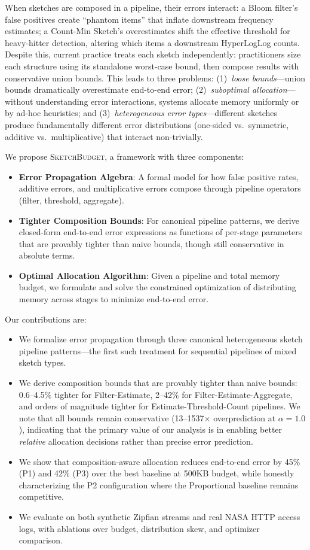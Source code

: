 \documentclass[preprint]{article}
\newcommand{\SketchBudget}{\textsc{SketchBudget}}
\begin{document}
When sketches are composed in a pipeline, their errors interact: a Bloom filter's false positives create ``phantom items'' that inflate downstream frequency estimates; a Count-Min Sketch's overestimates shift the effective threshold for heavy-hitter detection, altering which items a downstream HyperLogLog counts. Despite this, current practice treats each sketch independently: practitioners size each structure using its standalone worst-case bound, then compose results with conservative union bounds. This leads to three problems: (1)~\emph{loose bounds}---union bounds dramatically overestimate end-to-end error; (2)~\emph{suboptimal allocation}---without understanding error interactions, systems allocate memory uniformly or by ad-hoc heuristics; and (3)~\emph{heterogeneous error types}---different sketches produce fundamentally different error distributions (one-sided vs.\ symmetric, additive vs.\ multiplicative) that interact non-trivially.

We propose \SketchBudget{}, a framework with three components:
\begin{itemize}
    \item \textbf{Error Propagation Algebra}: A formal model for how false positive rates, additive errors, and multiplicative errors compose through pipeline operators (filter, threshold, aggregate).
    \item \textbf{Tighter Composition Bounds}: For canonical pipeline patterns, we derive closed-form end-to-end error expressions as functions of per-stage parameters that are provably tighter than naive bounds, though still conservative in absolute terms.
    \item \textbf{Optimal Allocation Algorithm}: Given a pipeline and total memory budget, we formulate and solve the constrained optimization of distributing memory across stages to minimize end-to-end error.
\end{itemize}

Our contributions are:
\begin{itemize}
    \item We formalize error propagation through three canonical heterogeneous sketch pipeline patterns---the first such treatment for sequential pipelines of mixed sketch types.
    \item We derive composition bounds that are provably tighter than naive bounds: 0.6--4.5\% tighter for Filter-Estimate, 2--42\% for Filter-Estimate-Aggregate, and orders of magnitude tighter for Estimate-Threshold-Count pipelines. We note that all bounds remain conservative (13--1537$\times$ overprediction at $\alpha=1.0$), indicating that the primary value of our analysis is in enabling better \emph{relative} allocation decisions rather than precise error prediction.
    \item We show that composition-aware allocation reduces end-to-end error by 45\% (P1) and 42\% (P3) over the best baseline at 500KB budget, while honestly characterizing the P2 configuration where the Proportional baseline remains competitive.
    \item We evaluate on both synthetic Zipfian streams and real NASA HTTP access logs, with ablations over budget, distribution skew, and optimizer comparison.
\end{itemize}
\end{document}
